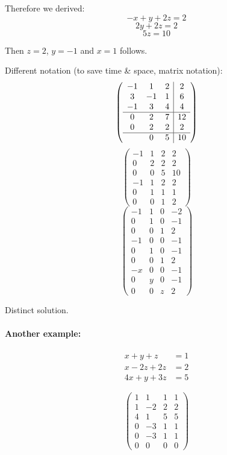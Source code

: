 \documentclass[a4paper,landscape,twocolumn]{article}
\begin{document}
Therefore we derived:
\[ -x + y + 2z = 2 \]
\[ 2y + 2z = 2 \]
\[ 5z = 10 \]

Then $z = 2$, $y = -1$ and $x = 1$ follows.

Different notation (to save time \& space, matrix notation):
\[
  \left(\begin{array}{ccc|c}
    -1 &  1 &  2 &  2 \\
     3 & -1 &  1 &  6 \\
    -1 &  3 &  4 &  4 \\
   \hline
     0 &  2 &  7 & 12 \\
     0 &  2 &  2 &  2 \\
   \hline
       &  0 &  5 & 10
  \end{array}\right)
\] \[
  \left(\begin{array}{ccc|c}
    -1 &  1 &  2 & 2 \\
     0 &  2 &  2 & 2 \\
     0 &  0 &  5 & 10 \\
   \hline
    -1 &  1 &  2 & 2 \\
     0 &  1 &  1 & 1 \\
     0 &  0 &  1 & 2
  \end{array}\right)
\] \[
  \left(\begin{array}{ccc|c}
    -1 &  1 &  0 & -2 \\
     0 &  1 &  0 & -1 \\
     0 &  0 &  1 & 2 \\
   \hline
    -1 &  0 &  0 & -1 \\
     0 &  1 &  0 & -1 \\
     0 &  0 &  1 & 2 \\
   \hline
    -x &  0 &  0 & -1 \\
     0 &  y &  0 & -1 \\
     0 &  0 &  z & 2
  \end{array}\right)
\]

Distinct solution.

\paragraph{Another example:}

\begin{align*}
  x + y + z &= 1 \\
  x - 2z + 2z &= 2 \\
  4x + y + 3z &= 5
\end{align*}

\[
  \left(\begin{array}{ccc|c}
     1 &  1 &  1 & 1 \\
     1 & -2 &  2 & 2 \\
     4 &  1 &  5 & 5 \\
   \hline
     0 & -3 &  1 & 1 \\
     0 & -3 &  1 & 1 \\
   \hline
     0 &  0 &  0 & 0
  \end{array}\right)
\]
\end{document}
